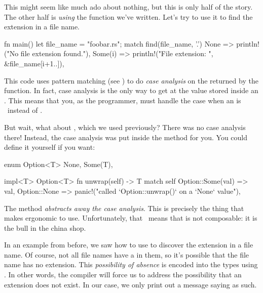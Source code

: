 \blank

This might seem like much ado about nothing, but this is only half of the story. The other half is \emph{using} the 
 function we've written. Let's try to use it to find the extension in a file name.

\begin{rustc}
fn main() {
    let file_name = "foobar.rs";
    match find(file_name, '.') {
        None => println!("No file extension found."),
        Some(i) => println!("File extension: {}", &file_name[i+1..]),
    }
}
\end{rustc}

This code uses pattern matching (see ) to do \emph{case analysis} on the  
returned by the  function. In fact, case analysis is the only way to get at the value stored inside an 
. This means that you, as the programmer, must handle the case when an  is \none\ 
instead of .

\blank

But wait, what about , which we used previously? There was no case analysis there! Instead, the case analysis 
was put inside the \code{unwrap} method for you. You could define it yourself if you want:

\begin{rustc}
enum Option<T> {
    None,
    Some(T),
}

impl<T> Option<T> {
    fn unwrap(self) -> T {
        match self {
            Option::Some(val) => val,
            Option::None =>
              panic!("called `Option::unwrap()` on a `None` value"),
        }
    }
}
\end{rustc}

The  method \emph{abstracts away the case analysis}. This is precisely the thing that makes  
ergonomic to use. Unfortunately, that \panic\ means that \code{unwrap} is not composable: it is the bull in the china shop.


In an example from before, we saw how to use  to discover the extension in a file name. Of course, not all file 
names have a \code{.} in them, so it's possible that the file name has no extension. This \emph{possibility of absence} is 
encoded into the types using \code{Option<T>}. In other words, the compiler will force us to address the possibility that 
an extension does not exist. In our case, we only print out a message saying as such.

